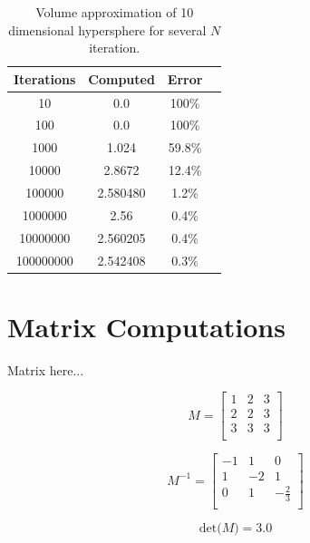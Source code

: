 \documentclass{article}
\begin{document}
\begin{table}[H]
  \begin{center}
    \begin{tabular}{|c|c|c|c|}
      \hline
      Iterations & Computed & Error \\
      \hline
      10 & 0.0 & 100\% \\
      \hline
      100 & 0.0 & 100\% \\
      \hline
      1000 & 1.024 & 59.8\% \\
      \hline
      10000 & 2.8672 & 12.4\% \\
      \hline
      100000 & 2.580480 & 1.2\% \\
      \hline
      1000000 & 2.56 & 0.4\% \\
      \hline
      10000000 & 2.560205 & 0.4\% \\
      \hline
      100000000 & 2.542408 & 0.3\% \\
      \hline
    \end{tabular}
  \end{center}
  \caption {Volume approximation of 10 dimensional hypersphere for several  $N$ iteration.}
  \label{tab:circle_results}
\end{table}


\section{Matrix Computations}

Matrix here...

\begin{equation}
 \label{eq:mat}
 M = \begin{bmatrix}
       1 & 2 & 3 \\[0.3em]
       2 & 2 & 3 \\[0.3em]
       3 & 3 & 3 \\[0.3em]
      \end{bmatrix}
\end{equation}

\begin{equation}
 \label{eq:mat}
 M^{-1} = \begin{bmatrix}
       -1 & 1 & 0 \\[0.3em]
       1 & -2 & 1 \\[0.3em]
       0 & 1 &  -\frac{2}{3}\\[0.3em]
      \end{bmatrix}
\end{equation}

\begin{equation}
 \label{eq:mat}
 \text{det(}M\text{)} = 3.0
\end{equation}
\end{document}
